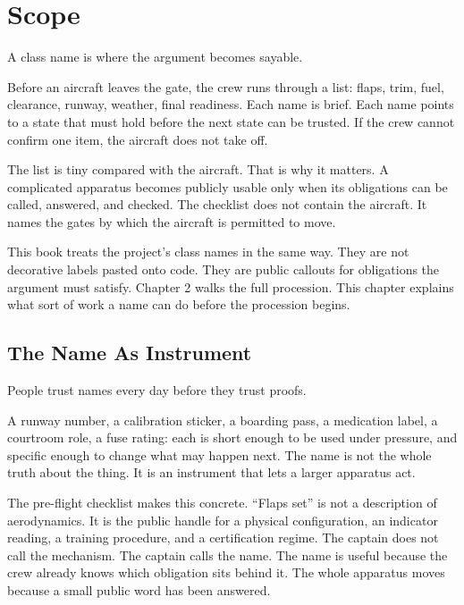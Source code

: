 \chapter{Scope}
\label{chap:scope}


A class name is where the argument becomes sayable.

Before an aircraft leaves the gate, the crew runs through a list: flaps, trim,
fuel, clearance, runway, weather, final readiness. Each name is brief. Each name
points to a state that must hold before the next state can be trusted. If the
crew cannot confirm one item, the aircraft does not take off.

The list is tiny compared with the aircraft. That is why it matters. A
complicated apparatus becomes publicly usable only when its obligations can be
called, answered, and checked. The checklist does not contain the aircraft. It
names the gates by which the aircraft is permitted to move.

This book treats the project's class names in the same way. They are not
decorative labels pasted onto code. They are public callouts for obligations the
argument must satisfy. Chapter 2 walks the full procession. This chapter explains
what sort of work a name can do before the procession begins.

\section{The Name As Instrument}
\label{se:the-name-as-instrument}

People trust names every day before they trust proofs.

A runway number, a calibration sticker, a boarding pass, a medication label, a
courtroom role, a fuse rating: each is short enough to be used under pressure,
and specific enough to change what may happen next. The name is not the whole
truth about the thing. It is an instrument that lets a larger apparatus act.

The pre-flight checklist makes this concrete. ``Flaps set'' is not a description
of aerodynamics. It is the public handle for a physical configuration, an
indicator reading, a training procedure, and a certification regime. The captain
does not call the mechanism. The captain calls the name. The name is useful
because the crew already knows which obligation sits behind it. The whole
apparatus moves because a small public word has been answered.

